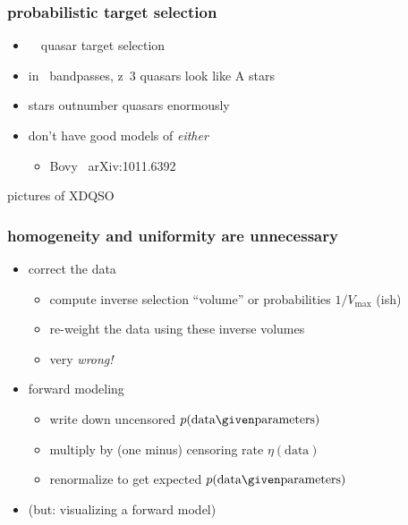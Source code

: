 \documentclass[pdftex]{beamer}
\newcommand{\data}{\mbox{data}}
\newcommand{\pars}{\mbox{parameters}}
\begin{document}
\begin{frame}
  \frametitle{probabilistic target selection}
  \begin{itemize}
  \item \sdssiii\ \boss\ quasar target selection
  \item in \sdss\ bandpasses, z~3 quasars look like A stars
  \item stars outnumber quasars enormously
  \item don't have good models of \emph{either}
    \begin{itemize}
    \item Bovy \etal\ arXiv:1011.6392
    \end{itemize}
  \end{itemize}
\end{frame}

\begin{frame}
pictures of XDQSO
\end{frame}

\begin{frame}
  \frametitle{homogeneity and uniformity are unnecessary}
  \begin{itemize}
  \item correct the data
    \begin{itemize}
    \item compute inverse selection ``volume'' or probabilities $1 / V_{\mathrm{max}}$ (ish)
    \item re-weight the data using these inverse volumes
    \item very \emph{wrong!}
    \end{itemize}
  \item forward modeling
    \begin{itemize}
    \item write down uncensored $p(\data\given\pars)$
    \item multiply by (one minus) censoring rate $\eta(\data)$
    \item renormalize to get expected $p(\data\given\pars)$
    \end{itemize}
  \item (but: visualizing a forward model)
  \end{itemize}
\end{frame}
\end{document}
